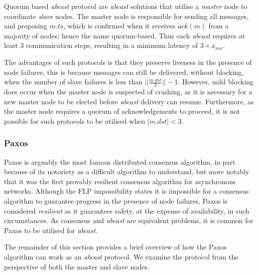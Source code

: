 	Quorum based \emph{abcast} protocol are \emph{abcast} solutions that utilise a \emph{master} node to coordinate \emph{slave} nodes.  The master node is responsible for sending all messages, and proposing $m.ts$, which is confirmed when it receives $ack(m)$ from a majority of nodes; hence the name quorum-based.  Thus each \emph{abcast} requires at least 3 communication steps, resulting in a minimum latency of $3 \times x_{mx}$.  
	
	The advantages of such protocols is that they preserve liveness in the presence of node failures, this is because messages can still be delivered, without blocking, when the number of slave failures is less than $\vert\vert \frac{m.dst}{2} \vert\vert - 1$.  However, mild blocking does occur when the master node is suspected of crashing, as it is necessary for a new master node to be elected before \emph{abcast} delivery can resume. Furthermore, as the master node requires a quorum of acknowledgements to proceed, it is not possible for such protocols to be utilised when $\left\vert m.dst \right\vert < 3$. 
		
		\subsubsection{Paxos}
		Paxos\citep{Lamport:1998:PP:279227.279229}\citep{Lamport:2001:PaxosMadeSimple} is arguably the most famous distributed consensus algorithm, in part because of its notoriety as a difficult algorithm to understand, but more notably that it was the first provably resilient consensus algorithm for asynchronous networks.  Although the FLP\citep{Fischer:1985:IDC:3149.214121} impossibility states it is impossible for a consensus algorithm to guarantee progress in the presence of node failures, Paxos is considered \emph{resilient} as it guarantees safety, at the expense of availability, in such circumstances.  As consensus and \emph{abcast} are equivalent problems\citep{Defago:2004:TOB:1041680.1041682}, it is common for Paxos to be utilised for \emph{abcast}.  
		
		The remainder of this section provides a brief overview of how the Paxos algorithm can work as an \emph{abcast} protocol.  We examine the protocol from the perspective of both the master and slave nodes.  
		
